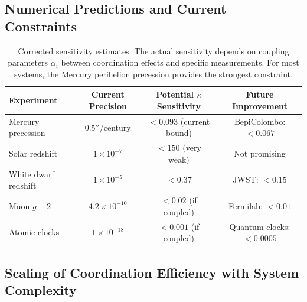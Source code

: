 \documentclass[11pt,a4paper]{article}
\begin{document}
	\subsection{Numerical Predictions and Current Constraints}
	
	\begin{table}[htbp]
		\centering
		\small
		\begin{tabular}{lccc}
			\toprule
			\textbf{Experiment} & \textbf{Current Precision} & \textbf{Potential $\kappa$ Sensitivity} & \textbf{Future Improvement} \\
			\midrule
			Mercury precession & $0.5''$/century & $<0.093$ (current bound) & BepiColombo: $<0.067$ \\
			Solar redshift & $1\times10^{-7}$ & $<150$ (very weak) & Not promising \\
			White dwarf redshift & $1\times10^{-5}$ & $<0.37$ & JWST: $<0.15$ \\
			Muon $g-2$ & $4.2\times10^{-10}$ & $<0.02$ (if coupled) & Fermilab: $<0.01$ \\
			Atomic clocks & $1\times10^{-18}$ & $<0.001$ (if coupled) & Quantum clocks: $<0.0005$ \\
			\bottomrule
		\end{tabular}
		\caption{Corrected sensitivity estimates. The actual sensitivity depends on coupling parameters $\alpha_i$ between coordination effects and specific measurements. For most systems, the Mercury perihelion precession provides the strongest constraint.}
	\end{table}
	
	\subsection{Scaling of Coordination Efficiency with System Complexity}
	
\end{document}

